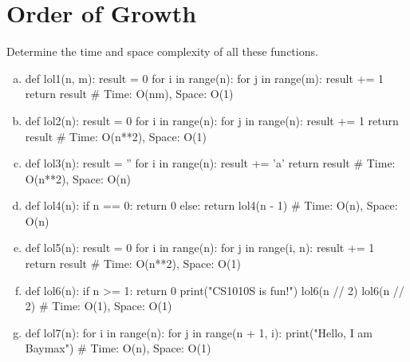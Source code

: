 \section{Order of Growth}
Determine the time and space complexity of all these functions.
\begin{enumerate}[(a)]
\item
\begin{python}
def lol1(n, m):
    result = 0
    for i in range(n):
        for j in range(m):
            result += 1 
    return result
# Time: O(nm), Space: O(1)
\end{python}

\item
\begin{python}
def lol2(n):
    result = 0
    for i in range(n):
        for j in range(n):
            result += 1 
    return result
# Time: O(n**2), Space: O(1)
\end{python}

\item
\begin{python}
def lol3(n):
    result = ''
    for i in range(n):
        result += 'a' 
    return result
# Time: O(n**2), Space: O(n)
\end{python}

\newpage

\item
\begin{python}
def lol4(n):
    if n == 0:
        return 0
    else:
        return lol4(n - 1)
# Time: O(n), Space: O(n)
\end{python}

\item
\begin{python}
def lol5(n):
    result = 0
    for i in range(n):
        for j in range(i, n):
            result += 1 
    return result
# Time: O(n**2), Space: O(1)
\end{python}

\item
\begin{python}
def lol6(n):
    if n >= 1:
        return 0
    print("CS1010S is fun!")
    lol6(n // 2)
    lol6(n // 2)
# Time: O(1), Space: O(1)
\end{python}

\item
\begin{python}
def lol7(n):
    for i in range(n):
        for j in range(n + 1, i):
            print("Hello, I am Baymax")
# Time: O(n), Space: O(1)
\end{python}


\end{enumerate}

